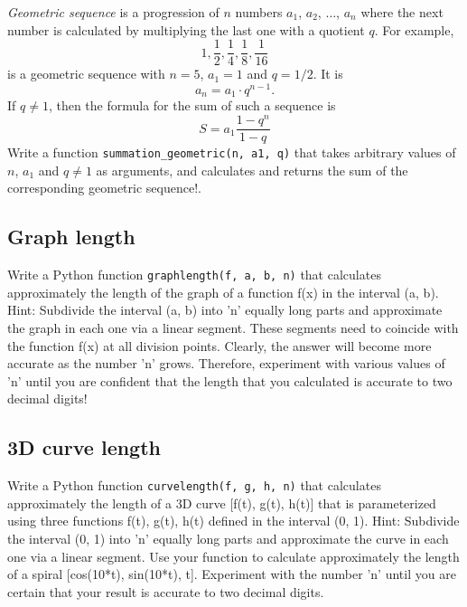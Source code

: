 {\em Geometric sequence} is a progression of $n$ numbers $a_1$, $a_2$, $\ldots$, $a_n$
where the next number is calculated by multiplying the last one with a quotient $q$.
For example, 
$$
1, \frac{1}{2}, \frac{1}{4}, \frac{1}{8}, \frac{1}{16}
$$
is a geometric sequence with $n = 5$, $a_1 = 1$ and $q = 1/2$. It is 
$$
a_n = a_1 \cdot q^{n-1}.
$$
If $q \not = 1$, then the formula for the sum of such a sequence is
$$
S = a_1\frac{1 - q^n}{1 - q}
$$
Write a function {\tt summation\_geometric(n, a1, q)} that takes arbitrary 
values of $n$, $a_1$ and $q \not = 1$ as arguments, and calculates 
and returns the sum of the corresponding geometric sequence!.


\subsection{Graph length}

Write a Python function {\tt graphlength(f, a, b, n)} that calculates approximately 
the length of the graph of a function f(x) in the interval (a, b). Hint: Subdivide the 
interval (a, b) into 'n' equally long parts and approximate the graph in each one via 
a linear segment. These segments need to coincide with the function f(x) at all division 
points. Clearly, the answer will become more accurate as the number 'n' grows. Therefore, 
experiment with various values of 'n' until you are confident that the length that you 
calculated is accurate to two decimal digits!


\subsection{3D curve length}

Write a Python function {\tt curvelength(f, g, h, n)} that calculates approximately 
the length of a 3D curve [f(t), g(t), h(t)] that is parameterized using three functions 
f(t), g(t), h(t) defined in the interval (0, 1). Hint: Subdivide the 
interval (0, 1) into 'n' equally long parts and approximate the curve in each one via 
a linear segment. Use your function to calculate approximately the length 
of a spiral [cos(10*t), sin(10*t), t]. Experiment with the number 'n' until you 
are certain that your result is accurate to two decimal digits.


